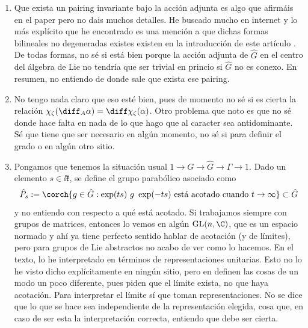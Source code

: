 {\begin{enumerate}
    \item[\textbf{(11)}] Que exista un pairing invariante bajo la acción adjunta es algo que afirmáis en el paper pero no dais muchos detalles. He buscado mucho en internet y lo más explícito que he encontrado es una mención a que dichas formas bilineales no degeneradas existes existen en la introducción de este artículo \parencite{Benito2024}. De todas formas, no sé si está bien porque la acción adjunta de \(\hat{G}\) en el centro del álgebra de Lie no tendría que ser trivial en princio si \(\hat{G}\) no es conexo. En resumen, no entiendo de donde sale que exista ese pairing.
    \item[\textbf{(12)}] No tengo nada claro que eso esté bien, pues de momento no sé si es cierta la relación \(\chi_\zeta(\diff_A \alpha)=\diff \chi_\zeta (\alpha)\). Otro problema que noto es que no sé donde hace falta en nada de lo que hago que al caracter sea antidominante. Sé que tiene que ser necesario en algún momento, no sé si para definir el grado o en algún otro sitio.
    \item[\textbf{(13)}] Pongamos que tenemos la situación usual \(1 \to G \to \hat{G} \to \Gamma \to 1\). Dado un elemento \(s \in \ii \mathfrak{k}\), se define el grupo parabólico asociado como
    \[
    \hat{P}_s:=\corch{g \in \hat{G}: \exp(ts)\ g \ \exp(-ts) \text{ está acotado cuando } t \to \infty }\subset \hat{G}
    \]
    y no entiendo con respecto a qué está acotado. Si trabajamos siempre con grupos de matrices, entonces lo vemos en algún \(\mathrm{GL}(n,\C)\), que es un espacio normado y ahí ya tiene perfecto sentido hablar de acotación (y de límites), pero para grupos de Lie abstractos no acabo de ver como lo hacemos. En el texto, lo he interpretado en términos de representaciones unitarias. Esto no lo he visto dicho explícitamente en ningún sitio, pero en \parencite{trautwein2015surveygitpictureyangmills} definen las cosas de un modo un poco diferente, pues piden que el límite exista, no que haya acotación. Para interpretar el límite sí que toman representaciones. No se dice que lo que se hace sea independiente de la representación elegida, cosa que, en caso de ser esta la interpretación correcta, entiendo que debe ser cierta.

\end{enumerate}}
